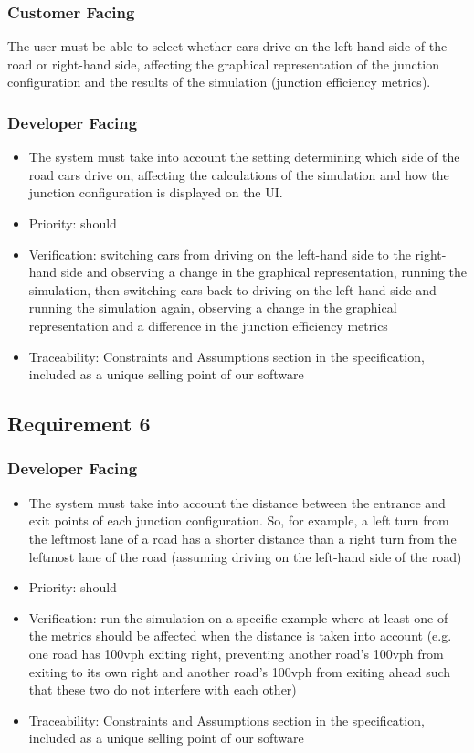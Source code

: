 \documentclass{article}
\begin{document}
\subsubsection{Customer Facing}
The user must be able to select whether cars drive on the left-hand side of 
the road or right-hand side, affecting the graphical representation of the junction
configuration and the results of the simulation (junction efficiency metrics).
\subsubsection{Developer Facing}
\begin{itemize}
  \item The system must take into account the setting determining which side of
  the road cars drive on, affecting the calculations of the simulation and how 
  the junction configuration is displayed on the UI.
  \item Priority: should
  \item Verification: switching cars from driving on the left-hand side to the 
  right-hand side and observing a change in the graphical representation, running 
  the simulation, then switching cars back to driving on the left-hand side and 
  running the simulation again, observing a change in the graphical representation 
  and a difference in the junction efficiency metrics
  \item Traceability: Constraints and Assumptions section in the specification, included 
  as a unique selling point of our software
\end{itemize}

\subsection{Requirement 6}
\subsubsection{Developer Facing}
\begin{itemize}
  \item The system must take into account the distance between the entrance and exit 
  points of each junction configuration. So, for example, a left turn from the 
  leftmost lane of a road has a shorter distance than a right turn from the leftmost 
  lane of the road (assuming driving on the left-hand side of the road)
  \item Priority: should
  \item Verification: run the simulation on a specific example where at least one of 
  the metrics should be affected when the distance is taken into account (e.g. one 
  road has 100vph exiting right, preventing another road’s 100vph from exiting to its
  own right and another road’s 100vph from exiting ahead such that these two do not 
  interfere with each other)
  \item Traceability: Constraints and Assumptions section in the specification, included 
  as a unique selling point of our software
\end{itemize}
\end{document}
